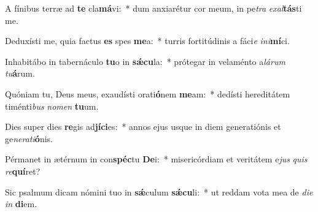 \item A fínibus terræ ad \textbf{te} cla\textbf{má}vi:~* dum anxiarétur cor meum, in pe\textit{tra} \textit{ex}\textit{al}\textbf{tás}ti me.
\item Deduxísti me, quia factus \textbf{es} spes \textbf{me}a:~* turris fortitúdinis a fáci\textit{e} \textit{in}\textit{i}\textbf{mí}ci.
\item Inhabitábo in tabernáculo \textbf{tu}o in \textbf{sǽ}\textbf{cu}la:~* prótegar in velaménto a\textit{lá}\textit{rum} \textit{tu}\textbf{á}rum.
\item Quóniam tu, Deus meus, exaudísti orati\textbf{ó}nem \textbf{me}am:~* dedísti hereditátem timénti\textit{bus} \textit{no}\textit{men} \textbf{tu}um.
\item Dies super dies \textbf{re}gis ad\textbf{jí}\textbf{ci}es:~* annos ejus usque in diem generatiónis et ge\textit{ne}\textit{ra}\textit{ti}\textbf{ó}nis.
\item Pérmanet in ætérnum in con\textbf{spéc}tu \textbf{De}i:~* misericórdiam et veritátem e\textit{jus} \textit{quis} \textit{re}\textbf{quí}ret?
\item Sic psalmum dicam nómini tuo in \textbf{sǽ}culum \textbf{sǽ}\textbf{cu}li:~* ut reddam vota mea de \textit{di}\textit{e} \textit{in} \textbf{di}em.
